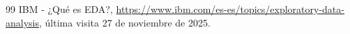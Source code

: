 \documentclass[a4paper,twocolumn]{article}
\begin{document}
	
		\begin{thebibliography}{99} %
		     IBM - ¿Qué es EDA?,
		    \newblock \href{https://www.ibm.com/es-es/topics/exploratory-data-analysis}{https://www.ibm.com/es-es/topics/exploratory-data-analysis}, \newblock [online] última visita 27 de noviembre de 2025.
	        
		\end{thebibliography}
	
	
	
\end{document}
